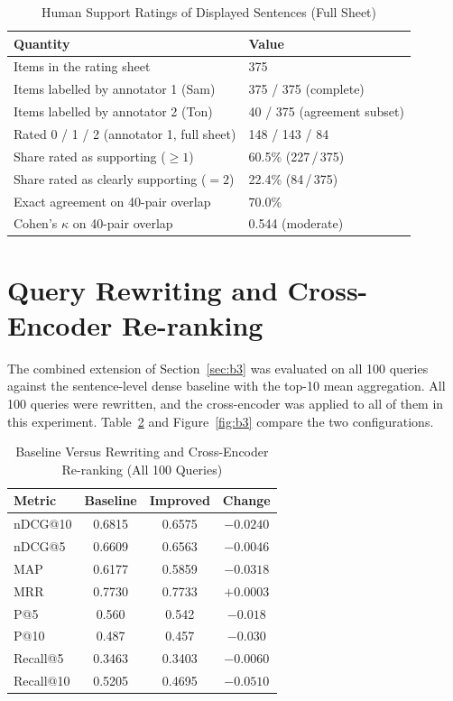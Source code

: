 \begin{table}[htbp]
\centering
\caption{Human Support Ratings of Displayed Sentences (Full Sheet)}
\label{tab:b2}
\small
\begin{tabular}{|p{}|p{}|}
\hline
\textbf{Quantity} & \textbf{Value} \\
\hline
Items in the rating sheet & 375 \\
\hline
Items labelled by annotator 1 (Sam) & 375 / 375 (complete) \\
\hline
Items labelled by annotator 2 (Ton) & 40 / 375 (agreement subset) \\
\hline
Rated 0 / 1 / 2 (annotator 1, full sheet) & 148 / 143 / 84 \\
\hline
Share rated as supporting ($\ge 1$) & 60.5\% (227\,/\,375) \\
\hline
Share rated as clearly supporting ($=2$) & 22.4\% (84\,/\,375) \\
\hline
Exact agreement on 40-pair overlap & 70.0\% \\
\hline
Cohen's $\kappa$ on 40-pair overlap & 0.544 (moderate) \\
\hline
\end{tabular}
\end{table}

\section{Query Rewriting and Cross-Encoder Re-ranking}
\label{sec:resb3}

The combined extension of Section~\ref{sec:b3} was evaluated on all 100 queries against the sentence-level dense baseline with the top-10 mean aggregation. All 100 queries were rewritten, and the cross-encoder was applied to all of them in this experiment. Table~\ref{tab:b3} and Figure~\ref{fig:b3} compare the two configurations.

\begin{table}[htbp]
\centering
\caption{Baseline Versus Rewriting and Cross-Encoder Re-ranking (All 100 Queries)}
\label{tab:b3}
\small
\begin{tabular}{|l|c|c|c|}
\hline
\textbf{Metric} & \textbf{Baseline} & \textbf{Improved} & \textbf{Change} \\
\hline
nDCG@10 & 0.6815 & 0.6575 & $-0.0240$ \\
\hline
nDCG@5 & 0.6609 & 0.6563 & $-0.0046$ \\
\hline
MAP & 0.6177 & 0.5859 & $-0.0318$ \\
\hline
MRR & 0.7730 & 0.7733 & $+0.0003$ \\
\hline
P@5 & 0.560 & 0.542 & $-0.018$ \\
\hline
P@10 & 0.487 & 0.457 & $-0.030$ \\
\hline
Recall@5 & 0.3463 & 0.3403 & $-0.0060$ \\
\hline
Recall@10 & 0.5205 & 0.4695 & $-0.0510$ \\
\hline
\end{tabular}
\end{table}

